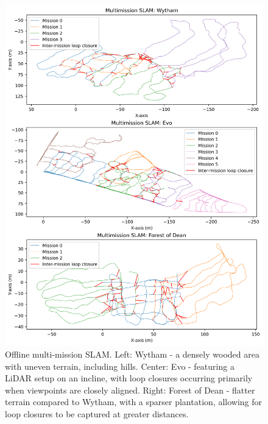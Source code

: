 \begin{figure}[t]
  \centering
  \includegraphics[width=0.99\columnwidth]{pics/exp_3_1_multimission_slam_big}
  \caption{Offline multi-mission SLAM. Left: Wytham - a densely wooded area with uneven terrain, including hills. Center: Evo - featuring a LiDAR setup on an incline, with loop closures occurring primarily when viewpoints are closely aligned. Right: Forest of Dean - flatter terrain compared to Wytham, with a sparser plantation, allowing for loop closures to be captured at greater distances. 
}
  \label{fig:exp_multi_mission}
\end{figure}

